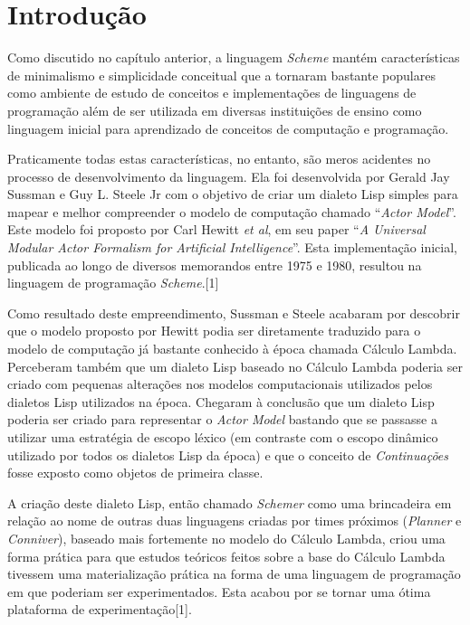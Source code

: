 
\section{Introdução}
\label{sec:introducao_scheme}

Como discutido no capítulo anterior, a linguagem \textit{Scheme} mantém
características de minimalismo e simplicidade conceitual que a tornaram
bastante populares como ambiente de estudo de conceitos e implementações de
linguagens de programação além de ser utilizada em diversas instituições de
ensino como linguagem inicial para aprendizado de conceitos de computação e
programação.

Praticamente todas estas características, no entanto, são meros acidentes no
processo de desenvolvimento da linguagem. Ela foi desenvolvida por Gerald Jay
Sussman e Guy L. Steele Jr com o objetivo de  criar um dialeto Lisp simples
para mapear e melhor compreender o modelo de computação chamado ``\textit{Actor
Model}''. Este modelo foi proposto por Carl Hewitt \textit{et al}, em seu paper
``\textit{A Universal Modular Actor Formalism for Artificial Intelligence}''.
Esta implementação inicial, publicada ao longo de diversos memorandos entre
1975 e 1980, resultou na linguagem de programação \textit{Scheme}.[1]

Como resultado deste empreendimento, Sussman e Steele acabaram por descobrir
que o modelo proposto por Hewitt podia ser diretamente traduzido para o modelo
de computação já bastante conhecido à época chamada Cálculo Lambda. Perceberam
também que um dialeto Lisp baseado no Cálculo Lambda poderia ser criado com
pequenas alterações nos modelos computacionais utilizados pelos dialetos Lisp
utilizados na época. Chegaram à conclusão que um dialeto Lisp poderia ser
criado para representar o \textit{Actor Model} bastando que se passasse a
utilizar uma estratégia de escopo léxico (em contraste com o escopo dinâmico
utilizado por todos os dialetos Lisp da época) e que o conceito de
\textit{Continuações} fosse exposto como objetos de primeira classe.

A criação deste dialeto Lisp, então chamado \textit{Schemer} como uma
brincadeira em relação ao nome de outras duas linguagens criadas por times
próximos (\textit{Planner} e \textit{Conniver}), baseado mais fortemente no
modelo do Cálculo Lambda, criou uma forma prática para que estudos teóricos
feitos sobre a base do Cálculo Lambda tivessem uma materialização prática na
forma de uma linguagem de programação em que poderiam ser experimentados. Esta
acabou por se tornar uma ótima plataforma de experimentação[1].


